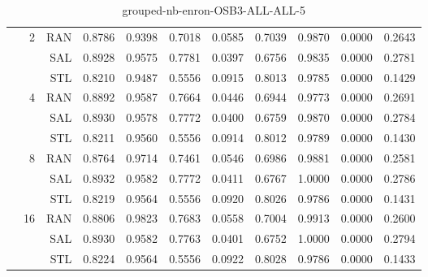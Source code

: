 \begin{center}
\begin{table}[htbp]
\begin{tabular}{ | r | r | r | r | r | r | r | r | r | r | r |}
 & \multirow{3}{*}{2} & RAN & 0.8786 & 0.9398 & 0.7018 & 0.0585 & 0.7039 & 0.9870 & 0.0000 & 0.2643\\ \cline{3-11}
 &   & SAL & 0.8928 & 0.9575 & 0.7781 & 0.0397 & 0.6756 & 0.9835 & 0.0000 & 0.2781\\ \cline{3-11}
 &   & STL & 0.8210 & 0.9487 & 0.5556 & 0.0915 & 0.8013 & 0.9785 & 0.0000 & 0.1429\\ \cline{2-11}
 & \multirow{3}{*}{4} & RAN & 0.8892 & 0.9587 & 0.7664 & 0.0446 & 0.6944 & 0.9773 & 0.0000 & 0.2691\\ \cline{3-11}
 &   & SAL & 0.8930 & 0.9578 & 0.7772 & 0.0400 & 0.6759 & 0.9870 & 0.0000 & 0.2784\\ \cline{3-11}
 &   & STL & 0.8211 & 0.9560 & 0.5556 & 0.0914 & 0.8012 & 0.9789 & 0.0000 & 0.1430\\ \cline{2-11}
 & \multirow{3}{*}{8} & RAN & 0.8764 & 0.9714 & 0.7461 & 0.0546 & 0.6986 & 0.9881 & 0.0000 & 0.2581\\ \cline{3-11}
 &   & SAL & 0.8932 & 0.9582 & 0.7772 & 0.0411 & 0.6767 & 1.0000 & 0.0000 & 0.2786\\ \cline{3-11}
 &   & STL & 0.8219 & 0.9564 & 0.5556 & 0.0920 & 0.8026 & 0.9786 & 0.0000 & 0.1431\\ \cline{2-11}
 & \multirow{3}{*}{16} & RAN & 0.8806 & 0.9823 & 0.7683 & 0.0558 & 0.7004 & 0.9913 & 0.0000 & 0.2600\\ \cline{3-11}
 &   & SAL & 0.8930 & 0.9582 & 0.7763 & 0.0401 & 0.6752 & 1.0000 & 0.0000 & 0.2794\\ \cline{3-11}
 &   & STL & 0.8224 & 0.9564 & 0.5556 & 0.0922 & 0.8028 & 0.9786 & 0.0000 & 0.1433\\ \cline{2-11}
\hline
\end{tabular}
\caption{grouped-nb-enron-OSB3-ALL-ALL-5}
\end{table}
\end{center}

